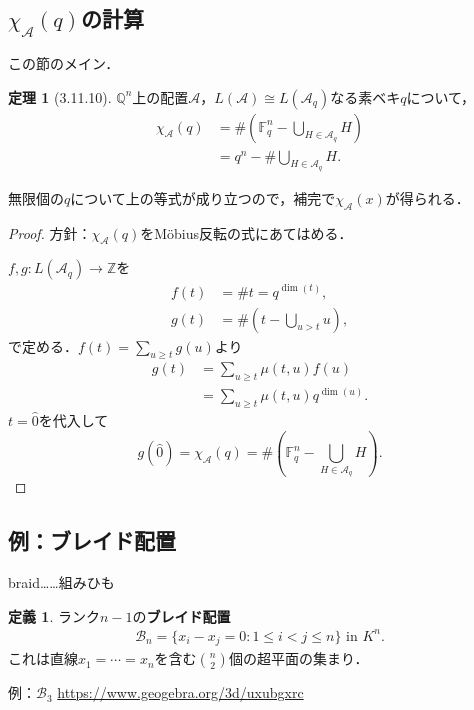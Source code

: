 \documentclass[xelatex,ja=standard,a4paper,14pt,everyparhook=compat]{bxjsarticle}
\newcommand{\bbQ}{\mathbb{Q}}
\newcommand{\bbZ}{\mathbb{Z}}
\newcommand{\bbF}{\mathbb{F}}
\newcommand{\mcA}{\mathcal{A}}
\newcommand{\mcB}{\mathcal{B}}
\theoremstyle{definition}
\newtheorem*{theorem}{定理}
\newtheorem*{definition}{定義}
\begin{document}
\subsection{$\chi_\mcA(q)$の計算}

この節のメイン．

\begin{theorem}[3.11.10]
    $\bbQ^n$上の配置$\mcA$，$L(\mcA) \cong L(\mcA_q)$なる素ベキ$q$について， \begin{align*}
        \chi_\mcA(q) & = \#\left(\bbF_q^n - \bigcup_{H \in \mcA_q} H\right) \\
                     & = q^n - \#\bigcup_{H \in \mcA_q} H.
    \end{align*}
\end{theorem}
無限個の$q$について上の等式が成り立つので，補完で$\chi_\mcA(x)$が得られる．
\begin{proof}
    方針：$\chi_\mcA(q)$をM\"obius反転の式にあてはめる．

    $f,g : L(\mcA_q) \to \bbZ$を \begin{align*}
        f(t) & = \#t = q^{\dim(t)},                    \\
        g(t) & = \#\left(t - \bigcup_{u > t} u\right),
    \end{align*}
    で定める．$f(t) = \sum_{u \geq t} g(u)$より \begin{align*}
        g(t) & = \sum_{u \geq t} \mu(t,u) f(u)         \\
             & = \sum_{u \geq t} \mu(t,u) q^{\dim(u)}.
    \end{align*}
    $t = \hat0$を代入して \begin{equation*}
        g(\hat0) = \chi_\mcA(q) = \#\left(\bbF_q^n - \bigcup_{H \in \mcA_q} H\right).
    \end{equation*}
\end{proof}

\subsection{例：ブレイド配置}
braid……組みひも

\begin{definition}
    ランク$n-1$の\textbf{ブレイド配置} \begin{align*}
        \mcB_n = \{x_i - x_j = 0 : 1 \leq i < j \leq n\} \text{ in $K^n$}.
    \end{align*}
    これは直線$x_1=\cdots=x_n$を含む$\binom{n}{2}$個の超平面の集まり．
\end{definition}
例：$\mcB_3$ \url{https://www.geogebra.org/3d/uxubgxrc}
\end{document}
